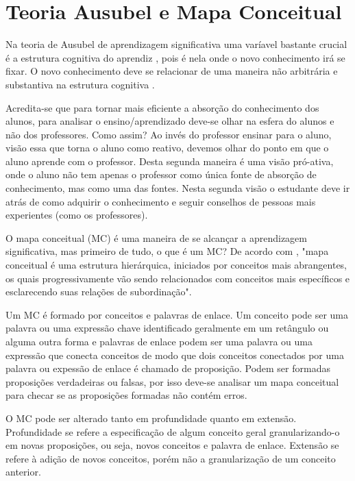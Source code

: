 
\section[Teoria Ausubel e Mapa Conceitual]{Teoria Ausubel e Mapa Conceitual}


Na teoria de Ausubel de aprendizagem significativa uma varíavel bastante crucial é a estrutura cognitiva do aprendiz \cite[p. 26]{ausebel}, pois é nela onde o novo conhecimento irá se fixar. O novo conhecimento deve se relacionar de uma maneira não arbitrária e substantiva na estrutura cognitiva \cite[p. 26]{ausebel}.

Acredita-se que para tornar mais eficiente a absorção do conhecimento dos alunos, para analisar o ensino/aprendizado deve-se olhar na esfera do alunos e não dos professores. Como assim? Ao invés do professor ensinar para o aluno, visão essa que torna o aluno como reativo, devemos olhar do ponto em que o aluno aprende com o professor. Desta segunda maneira é uma visão pró-ativa, onde o aluno não tem apenas o professor como única fonte de absorção de conhecimento, mas como uma das fontes. Nesta segunda visão o estudante deve ir atrás de como adquirir o conhecimento e seguir conselhos de pessoas mais experientes (como os professores).

O mapa conceitual (MC) é uma maneira de se alcançar a aprendizagem significativa, mas primeiro de tudo, o que é um MC? De acordo com , "mapa conceitual é uma estrutura hierárquica, iniciados por conceitos mais abrangentes, os quais progressivamente vão sendo relacionados com conceitos mais específicos e esclarecendo suas relações de subordinação".

Um MC é formado por conceitos e palavras de enlace. Um conceito pode ser uma palavra ou uma expressão chave identificado geralmente em um retângulo ou alguma outra forma e palavras de enlace podem ser uma palavra ou uma expressão que conecta conceitos de modo que dois conceitos conectados por uma palavra ou expessão de enlace é chamado de proposição. Podem ser formadas proposições verdadeiras ou falsas, por isso deve-se analisar um mapa conceitual para checar se as proposições formadas não contém erros.

O MC pode ser alterado tanto em profundidade quanto em extensão. Profundidade se refere a especificação de algum conceito geral granularizando-o em novas proposições, ou seja, novos conceitos e palavra de enlace. Extensão se refere à adição de novos conceitos, porém não a granularização de um conceito anterior.

